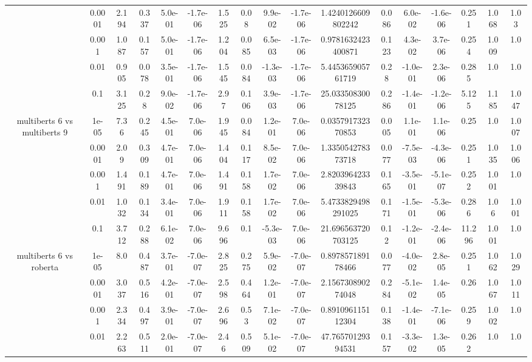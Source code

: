 \begin{tabular}{|c|c|c|c|c|c|c|c|c|c|c|c|c|c|c|c|c|}
 & 0.0001 & 2.194 & 0.337 & 5.0e-01 & -1.7e-06 & 1.525 & 0.08 & 9.9e-02 & -1.7e-06 & 1.4240126609802242 & 0.086 & 6.0e-02 & -1.6e-06 & 0.251 & 1.068 & 1.03 \\
 & 0.001 & 1.087 & 0.157 & 5.0e-01 & -1.7e-06 & 1.204 & 0.085 & 6.5e-03 & -1.7e-06 & 0.9781632423400871 & 0.123 & 4.3e-02 & 3.7e-06 & 0.254 & 1.009 & 1.0 \\
 & 0.01 & 0.905 & 0.078 & 3.5e-01 & -1.7e-06 & 1.545 & 0.084 & -1.3e-03 & -1.7e-06 & 5.445365905761719 & 0.28 & -1.0e-01 & 2.3e-06 & 0.285 & 1.0 & 1.0 \\
 & 0.1 & 3.125 & 0.28 & 9.0e-02 & -1.7e-06 & 2.97 & 0.106 & 3.9e-03 & -1.7e-06 & 25.03350830078125 & 0.286 & -1.4e-01 & -1.2e-06 & 5.125 & 1.185 & 1.047 \\
\hline
\multirow{5}{*}{multiberts 6 vs multiberts 9} & 1e-05 & 7.36 & 0.245 & 4.5e-01 & 7.0e-06 & 1.945 & 0.084 & 1.2e-01 & 7.0e-06 & 0.035791732370853 & 0.005 & 1.1e-01 & 1.1e-06 & 0.25 & 1.0 & 1.007 \\
 & 0.0001 & 2.09 & 0.309 & 4.7e-01 & 7.0e-06 & 1.404 & 0.117 & 8.5e-02 & 7.0e-06 & 1.335054278373718 & 0.077 & -7.5e-03 & -4.3e-06 & 0.251 & 1.035 & 1.006 \\
 & 0.001 & 1.491 & 0.189 & 4.7e-01 & 7.0e-06 & 1.491 & 0.158 & 1.7e-02 & 7.0e-06 & 2.820396423339843 & 0.165 & -3.5e-01 & -5.1e-07 & 0.252 & 1.001 & 1.0 \\
 & 0.01 & 1.032 & 0.134 & 3.4e-01 & 7.0e-06 & 1.911 & 0.158 & 1.7e-02 & 7.0e-06 & 5.4733829498291025 & 0.171 & -1.5e-01 & -5.3e-06 & 0.286 & 1.06 & 1.001 \\
 & 0.1 & 3.712 & 0.288 & 6.1e-02 & 7.0e-06 & 9.696 & 0.1 & -5.3e-03 & 7.0e-06 & 21.696563720703125 & 0.12 & -1.2e-01 & -2.4e-06 & 11.296 & 1.001 & 1.0 \\
\hline
\multirow{5}{*}{multiberts 6 vs roberta } & 1e-05 & 8.0 & 0.487 & 3.7e-01 & -7.0e-07 & 2.825 & 0.275 & 5.9e-02 & -7.0e-07 & 0.897857189178466 & 0.077 & -4.0e-02 & 2.8e-05 & 0.251 & 1.062 & 1.029 \\
 & 0.0001 & 3.037 & 0.516 & 4.2e-01 & -7.0e-07 & 2.598 & 0.464 & 1.2e-01 & -7.0e-07 & 2.156730890274048 & 0.284 & -5.1e-02 & 1.4e-05 & 0.26 & 1.067 & 1.011 \\
 & 0.001 & 2.334 & 0.497 & 3.9e-01 & -7.0e-07 & 2.696 & 0.53 & 7.1e-02 & -7.0e-07 & 0.891096115112304 & 0.138 & -1.4e-01 & -7.1e-06 & 0.259 & 1.002 & 1.0 \\
 & 0.01 & 2.263 & 0.511 & 2.0e-01 & -7.0e-07 & 2.46 & 0.509 & 5.1e-02 & -7.0e-07 & 47.76570129394531 & 0.157 & -3.3e-02 & 1.3e-05 & 0.262 & 1.0 & 1.0 \\

\end{tabular}
